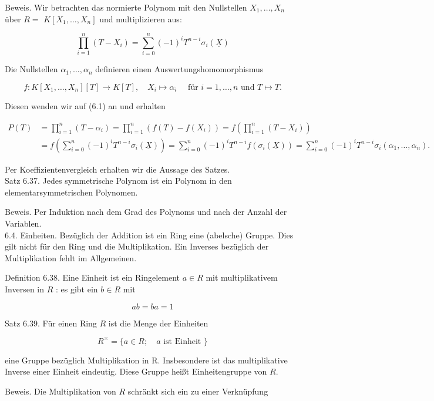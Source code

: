 \documentclass[10pt, letterpaper]{article}
\begin{document}
Beweis. Wir betrachten das normierte Polynom mit den Nullstellen $X_{1}, \ldots, X_{n}$ über $R=$ $K\left[X_{1}, \ldots, X_{n}\right]$ und multiplizieren aus:

$$
\prod_{i=1}^{n}\left(T-X_{i}\right)=\sum_{i=0}^{n}(-1)^{i} T^{n-i} \sigma_{i}(\underline{X})
$$

Die Nullstellen $\alpha_{1}, \ldots, \alpha_{n}$ definieren einen Auswertungshomomorphismus

$$
f: K\left[X_{1}, \ldots, X_{n}\right][T] \rightarrow K[T], \quad X_{i} \mapsto \alpha_{i} \quad \text { für } i=1, \ldots, n \text { und } T \mapsto T .
$$

Diesen wenden wir auf (6.1) an und erhalten

$$
\begin{aligned}
P(T) & =\prod_{i=1}^{n}\left(T-\alpha_{i}\right)=\prod_{i=1}^{n}\left(f(T)-f\left(X_{i}\right)\right)=f\left(\prod_{i=1}^{n}\left(T-X_{i}\right)\right) \\
& =f\left(\sum_{i=0}^{n}(-1)^{i} T^{n-i} \sigma_{i}(\underline{X})\right)=\sum_{i=0}^{n}(-1)^{i} T^{n-i} f\left(\sigma_{i}(\underline{X})\right)=\sum_{i=0}^{n}(-1)^{i} T^{n-i} \sigma_{i}\left(\alpha_{1}, \ldots, \alpha_{n}\right) .
\end{aligned}
$$

Per Koeffizientenvergleich erhalten wir die Aussage des Satzes.\\
Satz 6.37. Jedes symmetrische Polynom ist ein Polynom in den elementarsymmetrischen Polynomen.

Beweis. Per Induktion nach dem Grad des Polynoms und nach der Anzahl der Variablen.\\
6.4. Einheiten. Bezüglich der Addition ist ein Ring eine (abelsche) Gruppe. Dies gilt nicht für den Ring und die Multiplikation. Ein Inverses bezüglich der Multiplikation fehlt im Allgemeinen.

Definition 6.38. Eine Einheit ist ein Ringelement $a \in R$ mit multiplikativem Inversen in $R$ : es gibt ein $b \in R$ mit

$$
a b=b a=1
$$

Satz 6.39. Für einen Ring $R$ ist die Menge der Einheiten

$$
R^{\times}=\{a \in R ; \quad a \text { ist Einheit }\}
$$

eine Gruppe bezüglich Multiplikation in R. Insbesondere ist das multiplikative Inverse einer Einheit eindeutig. Diese Gruppe heißt Einheitengruppe von $R$.

Beweis. Die Multiplikation von $R$ schränkt sich ein zu einer Verknüpfung
\end{document}
